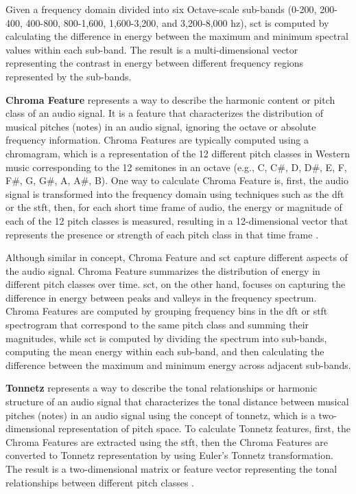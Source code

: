 Given a frequency domain divided into six Octave-scale sub-bands (0-200, 200-400, 400-800, 800-1,600, 1,600-3,200, and 3,200-8,000 \gls{hz}), \gls{sct} is computed by calculating the difference in energy between the maximum and minimum spectral values within each sub-band. The result is a multi-dimensional vector representing the contrast in energy between different frequency regions represented by the sub-bands.

\textbf{Chroma Feature} represents a way to describe the harmonic content or pitch class of an audio signal. It is a feature that characterizes the distribution of musical pitches (notes) in an audio signal, ignoring the octave or absolute frequency information. Chroma Features are typically computed using a chromagram, which is a representation of the 12 different pitch classes in Western music corresponding to the 12 semitones in an octave (e.g., C, C\#, D, D\#, E, F, F\#, G, G\#, A, A\#, B). One way to calculate Chroma Feature is, first, the audio signal is transformed into the frequency domain using techniques such as the \gls{dft} or the \gls{stft}, then, for each short time frame of audio, the energy or magnitude of each of the 12 pitch classes is measured, resulting in a 12-dimensional vector that represents the presence or strength of each pitch class in that time frame \cite{Bartsch2005}.

Although similar in concept, Chroma Feature and \gls{sct} capture different aspects of the audio signal. Chroma Feature summarizes the distribution of energy in different pitch classes over time. \gls{sct}, on the other hand, focuses on capturing the difference in energy between peaks and valleys in the frequency spectrum. Chroma Features are computed by grouping frequency bins in the \gls{dft} or \gls{stft} spectrogram that correspond to the same pitch class and summing their magnitudes, while \gls{sct} is computed by dividing the spectrum into sub-bands, computing the mean energy within each sub-band, and then calculating the difference between the maximum and minimum energy across adjacent sub-bands.

\textbf{Tonnetz} represents a way to describe the tonal relationships or harmonic structure of an audio signal that characterizes the tonal distance between musical pitches (notes) in an audio signal using the concept of tonnetz, which is a two-dimensional representation of pitch space. To calculate Tonnetz features, first, the Chroma Features are extracted using the \gls{stft}, then the Chroma Features are converted to Tonnetz representation by using Euler's Tonnetz transformation. The result is a two-dimensional matrix or feature vector representing the tonal relationships between different pitch classes \cite{Harte2006}.

